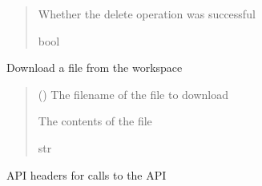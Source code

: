 \documentclass[letterpaper,10pt,english]{sphinxmanual}
\begin{document}
\begin{fulllineitems}
\begin{fulllineitems}
\begin{quote}
\begin{description}
\sphinxAtStartPar
{} \textendash{} Whether the delete operation was successful

\sphinxAtStartPar
bool

\end{description}\end{quote}

\end{fulllineitems}


\begin{fulllineitems}
\label{\detokenize{aisquared.platform:aisquared.platform.DatabricksClient.DatabricksClient.download_from_workspace}}
\pysigstartsignatures
{}
\pysigstopsignatures
\sphinxAtStartPar
Download a file from the workspace
\begin{quote}\begin{description}
\sphinxAtStartPar
{} () \textendash{} The filename of the file to download

\sphinxAtStartPar
{} \textendash{} The contents of the file

\sphinxAtStartPar
str

\end{description}\end{quote}

\end{fulllineitems}


\begin{fulllineitems}
\label{\detokenize{aisquared.platform:aisquared.platform.DatabricksClient.DatabricksClient.headers}}
\pysigstartsignatures
{}
\pysigstopsignatures
\sphinxAtStartPar
API headers for calls to the API


\end{fulllineitems}
\end{fulllineitems}
\end{document}
